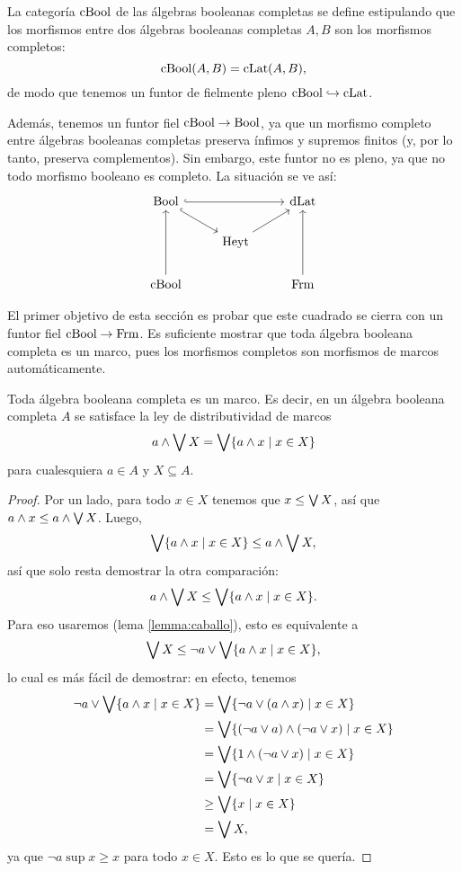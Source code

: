 
La categoría $\mathrm{cBool}$ de las álgebras booleanas completas se define
estipulando que los morfismos entre dos álgebras booleanas
completas $A,B$ son los morfismos completos:
\[
  \mathrm{cBool}(A,B)=\mathrm{cLat}(A,B)
,\]
de modo que tenemos un funtor de fielmente pleno
$\mathrm{cBool}\hookrightarrow\mathrm{cLat}$.

Además, tenemos un funtor fiel $\mathrm{cBool}\to\mathrm{Bool}$, ya que un morfismo
completo entre álgebras booleanas completas preserva ínfimos y
supremos finitos (y, por lo tanto, preserva complementos).
Sin embargo, este funtor no es pleno, ya que no todo morfismo booleano
es completo.
La situación se ve así:
\begin{equation}\label{diag:cuadrado-incompleto}
\begin{tikzcd}
  \Bool \ar[dr,hook] \ar[rr,hook] &               & \DLat \\
                                  & \Heyt \ar[ur]         \\
  \CBA \ar[uu] &           & \Frm \ar[uu]
\end{tikzcd}
\end{equation}

El primer objetivo de esta sección es probar que este cuadrado se
cierra con un funtor fiel $\mathrm{cBool}\to\mathrm{Frm}$.
Es suficiente mostrar que toda álgebra booleana completa es un marco,
pues los morfismos completos son morfismos de marcos automáticamente.

\begin{lemma}
    Toda álgebra booleana completa es un marco.
    Es decir, en un álgebra booleana completa $A$ se satisface la
    ley de distributividad de marcos
    \[
        a\wedge\bigvee X = \bigvee\{a\wedge x\mid x\in X\}
    \]
    para cualesquiera $a\in A$ y $X\subseteq A$.
\end{lemma}
\begin{proof}
    Por un lado, para todo $x\in X$ tenemos que $x\leq\bigvee X$, así que
    $a\wedge x\leq a\wedge\bigvee X$.
    Luego,
    \[
        \bigvee\{a\wedge x\mid x\in X\} \leq a\wedge\bigvee X
    ,\]
    así que solo resta demostrar la otra comparación:
    \[
        a\wedge\bigvee X \leq \bigvee\{a\wedge x\mid x\in X\}
    .\]
    Para eso usaremos (lema \ref{lemma:caballo}),
    esto es equivalente a
    \[
        \bigvee X \leq \neg a\vee \bigvee\{a\wedge x\mid x\in X\}
    ,\]
    lo cual es más fácil de demostrar: en efecto, tenemos
    \begin{align*}
        \neg a\vee\bigvee\{a\wedge x\mid x\in X\}
        &= \bigvee\{\neg a \vee(a\wedge x) \mid x\in X\} \\
        &= \bigvee\{(\neg a\vee a)\wedge(\neg a\vee x) \mid x\in X\} \\
        &= \bigvee\{1\wedge(\neg a\vee x) \mid x\in X\} \\
        &= \bigvee\{\neg a\vee x \mid x\in X\} \\
        &\geq \bigvee\{x \mid x\in X\} \\
        &= \bigvee X,
    \end{align*}
    ya que $\neg a\sup x\geq x$ para todo $x\in X$.
    Esto es lo que se quería.
\end{proof}

